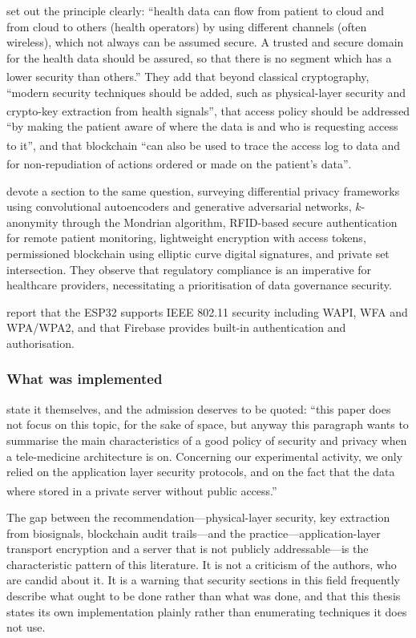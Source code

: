 \documentclass[12pt,a4paper,oneside]{report}
\newcommand{\bq}[1]{``#1''\textsuperscript{\dag}}
\begin{document}
\Textcite{mucchi2021} set out the principle clearly: \bq{health data can flow from patient to cloud and from cloud to others (health operators) by using different channels (often wireless), which not always can be assumed secure. A trusted and secure domain for the health data should be assured, so that there is no segment which has a lower security than others.} They add that beyond classical cryptography, \bq{modern security techniques should be added, such as physical-layer security and crypto-key extraction from health signals}, that access policy should be addressed \bq{by making the patient aware of where the data is and who is requesting access to it}, and that blockchain \bq{can also be used to trace the access log to data and for non-repudiation of actions ordered or made on the patient's data}.

\Textcite{liu2025review} devote a section to the same question, surveying differential privacy frameworks using convolutional autoencoders and generative adversarial networks, $k$-anonymity through the Mondrian algorithm, RFID-based secure authentication for remote patient monitoring, lightweight encryption with access tokens, permissioned blockchain using elliptic curve digital signatures, and private set intersection. They observe that regulatory compliance is an imperative for healthcare providers, necessitating a prioritisation of data governance security.

\Textcite{efendi2025} report that the ESP32 supports IEEE 802.11 security including WAPI, WFA and WPA/WPA2, and that Firebase provides built-in authentication and authorisation.

\subsubsection{What was implemented}\label{sec:security-gap}

\Textcite{mucchi2021} state it themselves, and the admission deserves to be quoted: \bq{this paper does not focus on this topic, for the sake of space, but anyway this paragraph wants to summarise the main characteristics of a good policy of security and privacy when a tele-medicine architecture is on. Concerning our experimental activity, we only relied on the application layer security protocols, and on the fact that the data where stored in a private server without public access.}

The gap between the recommendation---physical-layer security, key extraction from biosignals, blockchain audit trails---and the practice---application-layer transport encryption and a server that is not publicly addressable---is the characteristic pattern of this literature. It is not a criticism of the authors, who are candid about it. It is a warning that security sections in this field frequently describe what ought to be done rather than what was done, and that this thesis states its own implementation plainly rather than enumerating techniques it does not use.
\end{document}
